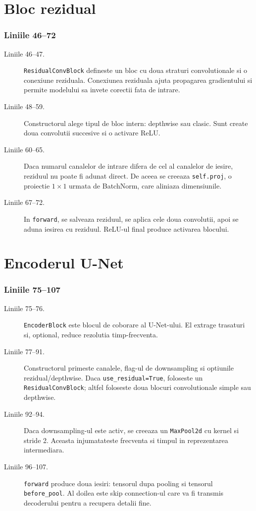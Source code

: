 \documentclass[12pt,a4paper]{report}
\newcommand{\codechunk}[2]{%
\subsection*{Liniile #1--#2}

}
\begin{document}
\chapter{Bloc rezidual}

\codechunk{46}{72}

\begin{description}
    \item[Liniile 46--47.] \texttt{ResidualConvBlock} defineste un bloc cu doua
    straturi convolutionale si o conexiune reziduala. Conexiunea reziduala ajuta
    propagarea gradientului si permite modelului sa invete corectii fata de intrare.

    \item[Liniile 48--59.] Constructorul alege tipul de bloc intern: depthwise sau
    clasic. Sunt create doua convolutii succesive si o activare ReLU.

    \item[Liniile 60--65.] Daca numarul canalelor de intrare difera de cel al
    canalelor de iesire, reziduul nu poate fi adunat direct. De aceea se creeaza
    \texttt{self.proj}, o proiectie \(1 \times 1\) urmata de BatchNorm, care
    aliniaza dimensiunile.

    \item[Liniile 67--72.] In \texttt{forward}, se salveaza reziduul, se aplica
    cele doua convolutii, apoi se aduna iesirea cu reziduul. ReLU-ul final produce
    activarea blocului.
\end{description}

\chapter{Encoderul U-Net}

\codechunk{75}{107}

\begin{description}
    \item[Liniile 75--76.] \texttt{EncoderBlock} este blocul de coborare al U-Net-ului.
    El extrage trasaturi si, optional, reduce rezolutia timp-frecventa.

    \item[Liniile 77--91.] Constructorul primeste canalele, flag-ul de downsampling
    si optiunile rezidual/depthwise. Daca \texttt{use\_residual=True}, foloseste
    un \texttt{ResidualConvBlock}; altfel foloseste doua blocuri convolutionale
    simple sau depthwise.

    \item[Liniile 92--94.] Daca downsampling-ul este activ, se creeaza un
    \texttt{MaxPool2d} cu kernel si stride 2. Aceasta injumatateste frecventa si
    timpul in reprezentarea intermediara.

    \item[Liniile 96--107.] \texttt{forward} produce doua iesiri: tensorul dupa
    pooling si tensorul \texttt{before\_pool}. Al doilea este skip connection-ul
    care va fi transmis decoderului pentru a recupera detalii fine.
\end{description}
\end{document}
